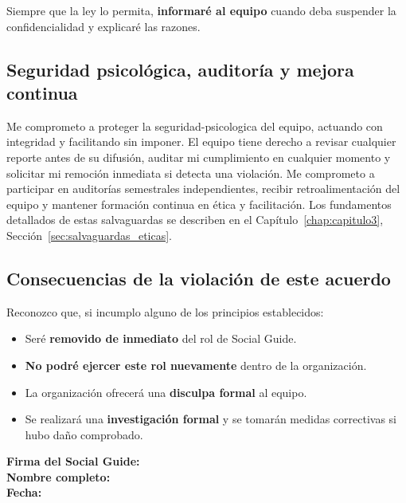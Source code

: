 Siempre que la ley lo permita, \textbf{informaré al equipo} cuando deba suspender la confidencialidad y explicaré las razones.

\subsection{Seguridad psicológica, auditoría y mejora continua}

Me comprometo a proteger la \gls{seguridad-psicologica} del equipo, actuando con integridad y facilitando sin imponer. El equipo tiene derecho a revisar cualquier reporte antes de su difusión, auditar mi cumplimiento en cualquier momento y solicitar mi remoción inmediata si detecta una violación. Me comprometo a participar en auditorías semestrales independientes, recibir retroalimentación del equipo y mantener formación continua en ética y facilitación. Los fundamentos detallados de estas salvaguardas se describen en el Capítulo~\ref{chap:capitulo3}, Sección~\ref{sec:salvaguardas_eticas}.

\subsection{Consecuencias de la violación de este acuerdo}

Reconozco que, si incumplo alguno de los principios establecidos:

\begin{itemize}
    \item Seré \textbf{removido de inmediato} del rol de Social Guide.
    \item \textbf{No podré ejercer este rol nuevamente} dentro de la organización.
    \item La organización ofrecerá una \textbf{disculpa formal} al equipo.
    \item Se realizará una \textbf{investigación formal} y se tomarán medidas correctivas si hubo daño comprobado.
\end{itemize}

\vspace{1cm}

\noindent
\textbf{Firma del Social Guide:} \underline{\hspace{6cm}} \\[0.5cm]

\textbf{Nombre completo:} \underline{\hspace{6cm}} \\[0.5cm]

\textbf{Fecha:} \underline{\hspace{4cm}} \\[1cm]


